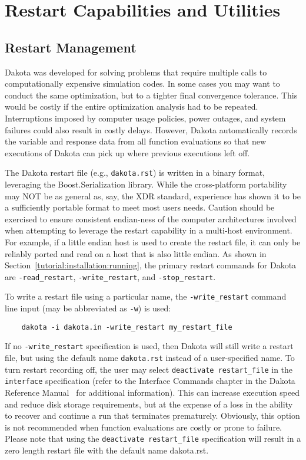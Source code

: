 \chapter{Restart Capabilities and Utilities}\label{restart}

\section{Restart Management}\label{restart:management}

Dakota was developed for solving problems that require multiple calls
to computationally expensive simulation codes. In some cases you may
want to conduct the same optimization, but to a tighter final
convergence tolerance. This would be costly if the entire optimization
analysis had to be repeated. Interruptions imposed by computer usage
policies, power outages, and system failures could also result in
costly delays. However, Dakota automatically records the variable and
response data from all function evaluations so that new executions of
Dakota can pick up where previous executions left off.

The Dakota restart file (e.g., \texttt{dakota.rst}) is written in a
binary format, leveraging the Boost.Serialization library. While the
cross-platform portability may NOT be as general as, say, the XDR standard,
experience has shown it to be a sufficiently portable format to meet
most users needs.  Caution should be exercised to ensure consistent
endian-ness of the computer architectures involved when attempting to leverage
the restart capability in a multi-host environment.  For example, if a little
endian host is used to create the restart file, it can only be reliably ported
and read on a host that is also little endian.  As shown in
Section~\ref{tutorial:installation:running},
the primary restart commands for Dakota are
\texttt{-read\_restart}, \texttt{-write\_restart}, and \texttt{-stop\_restart}.

To write a restart file using a particular name, the
\texttt{-write\_restart} command line input (may be abbreviated as
\texttt{-w}) is used:
\begin{small}
\begin{verbatim}
    dakota -i dakota.in -write_restart my_restart_file
\end{verbatim}
\end{small}
If no \texttt{-write\_restart} specification is used, then Dakota will
still write a restart file, but using the default name
\texttt{dakota.rst} instead of a user-specified name.  To turn restart
recording off, the user may select \texttt{deactivate restart\_file}
in the \texttt{interface} specification (refer to the Interface
Commands chapter in the Dakota Reference Manual~\cite{RefMan} for
additional information).  This can increase execution speed and reduce
disk storage requirements, but at the expense of a loss in the ability
to recover and continue a run that terminates prematurely.  Obviously,
this option is not recommended when function evaluations are costly or
prone to failure. Please note that using the \texttt{deactivate restart\_file}
specification will result in a zero length restart file
with the default name dakota.rst.

